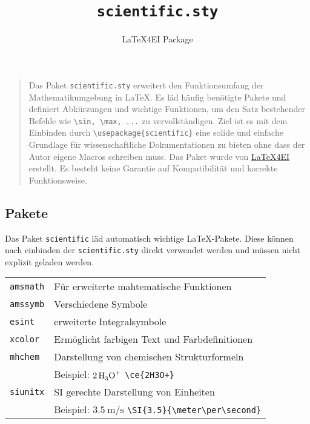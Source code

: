 \documentclass[8pt,a5paper]{scrartcl}
\title{\texttt{scientific.sty}}
\author{LaTeX4EI Package}
\begin{document}
\maketitle



	\begin{quotation}
		Das Paket \texttt{scientific.sty} erweitert den Funktionsumfang der Mathematikumgebung in \LaTeX. 
		Es läd häufig benötigte Pakete und definiert Abkürzungen und wichtige Funktionen, um den Satz bestehender Befehle wie \verb#\sin, \max, ...# zu vervollständigen.
		Ziel ist es mit dem Einbinden durch \verb#\usepackage{scientific}# eine solide und einfache Grundlage für wissenschaftliche Dokumentationen zu bieten ohne
		dass der Autor eigene Macros schreiben muss.
		Das Paket wurde von \href{www.latex4ei.de}{LaTeX4EI} erstellt. Es besteht keine Garantie auf Kompatibilität und korrekte Funktionsweise.
	\end{quotation}



	\subsection{Pakete}
	Das Paket \verb#scientific# läd automatisch wichtige \LaTeX-Pakete. Diese können nach einbinden der \verb#scientific.sty# direkt verwendet werden und müssen nicht explizit geladen werden.\\
	\begin{tabular}{ll}
		\verb#amsmath# & Für erweiterte mahtematische Funktionen\\
		\verb#amssymb# & Verschiedene Symbole\\
		\verb#esint# & erweiterte Integralsymbole\\
		\verb#xcolor# & Ermöglicht farbigen Text und Farbdefinitionen\\
		\verb#mhchem# & Darstellung von chemischen Strukturformeln\\
			& Beispiel: $\ce{2H3O+}$ \verb#\ce{2H3O+}#\\
		\verb#siunitx# & SI gerechte Darstellung von Einheiten\\
			& Beispiel: $\SI{3.5}{\meter\per\second}$ \verb#\SI{3.5}{\meter\per\second}#\\
	\end{tabular}
		
\end{document}
